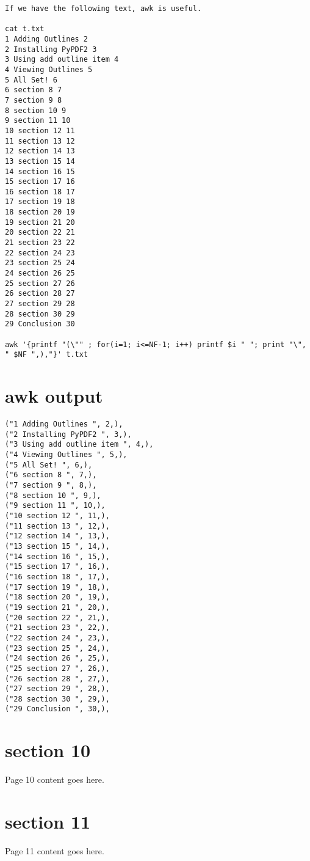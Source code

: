 \documentclass{article}
\begin{document}
\begin{verbatim}
If we have the following text, awk is useful.

cat t.txt
1 Adding Outlines 2
2 Installing PyPDF2 3
3 Using add outline item 4
4 Viewing Outlines 5
5 All Set! 6
6 section 8 7
7 section 9 8
8 section 10 9
9 section 11 10
10 section 12 11
11 section 13 12
12 section 14 13
13 section 15 14
14 section 16 15
15 section 17 16
16 section 18 17
17 section 19 18
18 section 20 19
19 section 21 20
20 section 22 21
21 section 23 22
22 section 24 23
23 section 25 24
24 section 26 25
25 section 27 26
26 section 28 27
27 section 29 28
28 section 30 29
29 Conclusion 30

awk '{printf "(\"" ; for(i=1; i<=NF-1; i++) printf $i " "; print "\", " $NF ",),"}' t.txt
\end{verbatim}



\newpage

\section{awk output}

\begin{verbatim}
("1 Adding Outlines ", 2,),
("2 Installing PyPDF2 ", 3,),
("3 Using add outline item ", 4,),
("4 Viewing Outlines ", 5,),
("5 All Set! ", 6,),
("6 section 8 ", 7,),
("7 section 9 ", 8,),
("8 section 10 ", 9,),
("9 section 11 ", 10,),
("10 section 12 ", 11,),
("11 section 13 ", 12,),
("12 section 14 ", 13,),
("13 section 15 ", 14,),
("14 section 16 ", 15,),
("15 section 17 ", 16,),
("16 section 18 ", 17,),
("17 section 19 ", 18,),
("18 section 20 ", 19,),
("19 section 21 ", 20,),
("20 section 22 ", 21,),
("21 section 23 ", 22,),
("22 section 24 ", 23,),
("23 section 25 ", 24,),
("24 section 26 ", 25,),
("25 section 27 ", 26,),
("26 section 28 ", 27,),
("27 section 29 ", 28,),
("28 section 30 ", 29,),
("29 Conclusion ", 30,),
\end{verbatim}


\newpage

\section{section 10}
Page 10 content goes here.
\newpage

\section{section 11}
Page 11 content goes here.
\newpage
\end{document}

